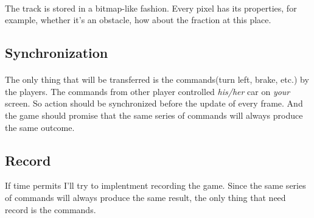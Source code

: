 \documentclass{article}
\begin{document}
    \paragraph{}
        The track is stored in a bitmap-like fashion. Every pixel has its properties, for example, whether it's an obstacle, how about the fraction at this place.
    \subsection*{Synchronization}
    \paragraph{}
        The only thing that will be transferred is the commands(turn left, brake, etc.) by the players. The commands from other player controlled \emph{his/her} car on \emph{your} screen. So action should be synchronized before the update of every frame. And the game should promise that the same series of commands will always produce the same outcome.
    \subsection*{Record}
        If time permits I'll try to implentment recording the game. Since the same series of commands will always produce the same result, the only thing that need record is the commands.
\end{document}
